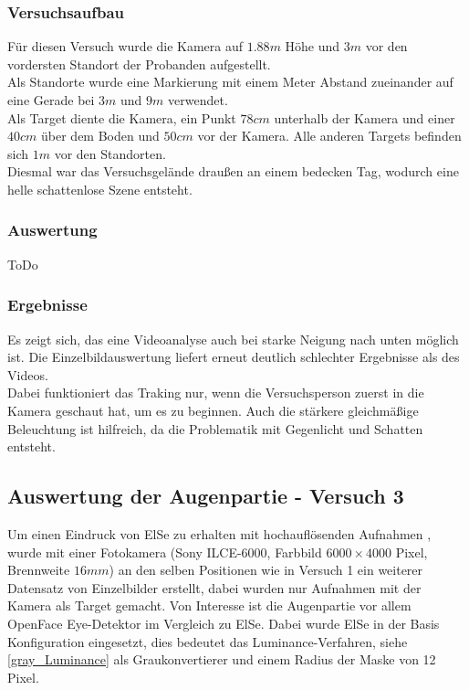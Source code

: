 \subsubsection{Versuchsaufbau}
Für diesen Versuch wurde die Kamera auf $1.88m$ Höhe und $3m$ vor den vordersten Standort der Probanden aufgestellt.\\
Als Standorte wurde eine Markierung mit einem Meter Abstand zueinander auf eine Gerade bei $3m$ und $9m$ verwendet.\\
Als Target diente die Kamera, ein Punkt $78cm$ unterhalb der Kamera und einer $40cm$ über dem Boden und $50cm$ vor der Kamera. Alle anderen Targets befinden sich $1m$ vor den Standorten.\\
Diesmal war das Versuchsgelände draußen an einem bedecken Tag, wodurch eine helle schattenlose Szene entsteht.
\subsubsection{Auswertung}
ToDo
\subsubsection{Ergebnisse}
Es zeigt sich, das eine Videoanalyse auch bei starke Neigung nach unten möglich ist. Die Einzelbildauswertung liefert erneut deutlich schlechter Ergebnisse als des Videos.\\
Dabei funktioniert das Traking nur, wenn die Versuchsperson zuerst in die Kamera geschaut hat, um es zu beginnen. Auch die stärkere gleichmäßige Beleuchtung ist hilfreich, da die Problematik mit Gegenlicht und Schatten entsteht.
\subsection{Auswertung der Augenpartie - Versuch 3}
Um einen Eindruck von ElSe zu erhalten mit hochauflösenden Aufnahmen , wurde mit einer Fotokamera (Sony ILCE-6000, Farbbild $6000\times 4000$ Pixel, Brennweite $16mm$) an den selben Positionen wie in Versuch 1 ein weiterer Datensatz von Einzelbilder erstellt, dabei wurden nur Aufnahmen mit der Kamera als Target gemacht. Von Interesse ist die Augenpartie vor allem OpenFace Eye-Detektor im Vergleich zu ElSe. Dabei wurde ElSe in der Basis Konfiguration eingesetzt, dies bedeutet das Luminance-Verfahren, siehe \autoref{gray_Luminance} als Graukonvertierer und einem Radius der Maske von 12 Pixel.
